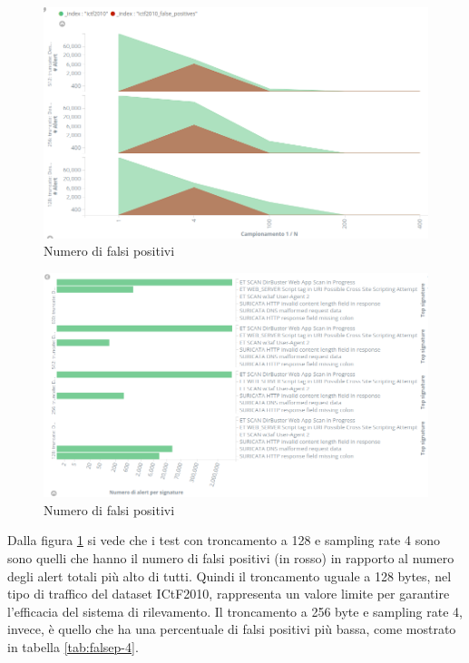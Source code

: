 \documentclass[12pt,a4paper,openright,twoside]{report}
\begin{document}
\begin{figure}[h!]
\begin{center}                          %
  \includegraphics[width=\textwidth]{images/ICTF-false-positives-mul.png}
  \caption{Numero di falsi positivi}
  \label{fig:ictf:falsep}
\end{center}
\end{figure}

\begin{figure}[h!]
\begin{center}                          %
  \includegraphics[width=\textwidth]{images/ICTF-top-signatures.png}
  \caption{Numero di falsi positivi}
  \label{}
\end{center}
\end{figure}

Dalla figura \ref{fig:ictf:falsep} si vede che i test con troncamento a 128 e sampling rate 4 sono
sono quelli che hanno il numero di falsi positivi (in rosso) in rapporto
al numero degli alert totali pi\`u alto di tutti.
Quindi il troncamento uguale a 128 bytes, nel tipo di traffico del dataset ICtF2010,
rappresenta un valore limite per garantire l'efficacia del sistema di rilevamento.
Il troncamento a 256 byte e sampling rate 4, invece,  \`e quello che ha una percentuale
di falsi positivi pi\`u bassa, come mostrato in tabella \ref{tab:falsep-4}.
\end{document}

